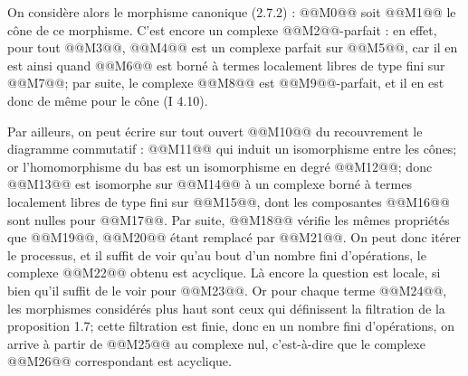 
On
considère alors le morphisme canonique (2.7.2) :
@@M0@@
soit @@M1@@ le cône de ce morphisme. C'est encore un complexe @@M2@@-parfait : en effet, pour tout @@M3@@, @@M4@@ est un complexe parfait sur @@M5@@, car il en est ainsi quand @@M6@@ est borné à termes localement libres de type fini sur @@M7@@; par suite, le complexe @@M8@@ est @@M9@@-parfait, et il en est donc de même pour le cône (I 4.10).

Par ailleurs, on peut écrire sur tout ouvert @@M10@@ du recouvrement le diagramme commutatif :
@@M11@@
qui induit un isomorphisme entre les cônes; or l'homomorphisme du bas est un isomorphisme en degré @@M12@@; donc @@M13@@ est isomorphe sur @@M14@@ à un complexe borné à termes localement libres de type fini sur @@M15@@, dont les composantes @@M16@@ sont nulles pour @@M17@@. Par suite, @@M18@@ vérifie les mêmes propriétés que @@M19@@, @@M20@@ étant remplacé par @@M21@@. On peut donc itérer le processus, et il suffit de voir qu'au bout d'un nombre fini d'opérations, le complexe @@M22@@ obtenu est acyclique. Là encore la question est locale, si bien qu'il suffit de le voir pour @@M23@@. Or pour chaque terme @@M24@@, les morphismes considérés plus haut sont ceux qui définissent la filtration de la proposition 1.7; cette filtration est finie, donc en un nombre fini d'opérations, on arrive à partir de @@M25@@ au complexe nul, c'est-à-dire que le complexe @@M26@@ correspondant est acyclique.

